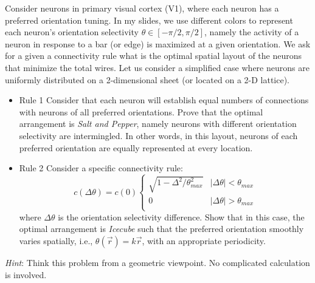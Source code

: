 \documentclass{article}
\newcommand{\abs}[1]{\lvert #1 \rvert}
\begin{document}
Consider neurons in primary visual cortex (V1), where each neuron has a preferred orientation tuning. In my slides, we use different colors to represent each neuron's orientation selectivity $\theta \in [-\pi/2, \pi/2]$, namely the activity of a neuron in response to a bar (or edge) is maximized at a given orientation. We ask for a given a connectivity rule what is the optimal spatial layout of the neurons that minimize the total wires. Let us consider a simplified case where neurons are uniformly distributed on a 2-dimensional sheet (or located on a 2-D lattice). 
\begin{itemize}
\item {Rule 1} Consider that each neuron will establish equal numbers of connections with neurons of all preferred orientations. Prove that the optimal arrangement is \emph{Salt and Pepper}, namely neurons with different orientation selectivity are intermingled. In other words, in this layout, neurons of each preferred orientation are equally represented at every location. 
\item{Rule 2} Consider a specific connectivity rule:
\[
c(\Delta\theta) = c(0) 
\begin{cases} 
\sqrt{1- \Delta^2/\theta_{max}^2} & \abs{\Delta \theta} < \theta_{max} \\
0 & \abs{\Delta \theta} > \theta_{max} \\
\end{cases}
\]
where $\Delta\theta$ is the orientation selectivity difference.  Show that in this case, the optimal arrangement is \emph{Icecube} such that the preferred orientation smoothly varies spatially, i.e., $\theta(\vec{r}) = k\vec{r}$, with an appropriate periodicity. 
\end{itemize}
\emph{Hint}: Think this problem from a geometric viewpoint. No complicated calculation is involved.
\end{document}
